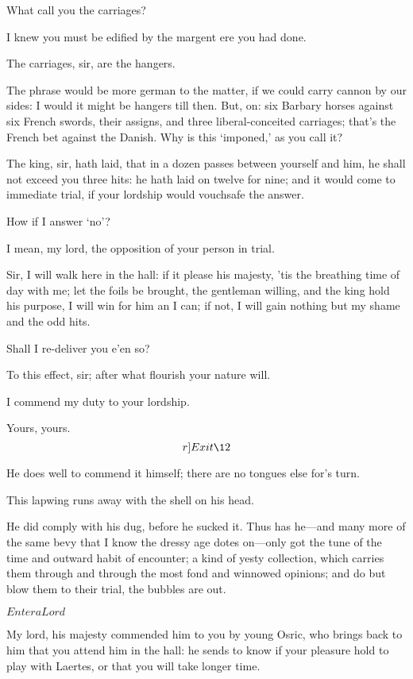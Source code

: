 \documentclass[11pt]{book}
\begin{document}
\1	What call you the carriages?

\6	I knew you must be edified by the margent ere you had done.

	The carriages, sir, are the hangers.

\1	\DriveOut* The phrase would be more german to the matter, if we
	could carry cannon by our sides: I would it might
	be hangers till then. But, on: six Barbary horses
	against six French swords, their assigns, and three
	liberal-conceited carriages; that's the French bet
	against the Danish. Why is this `imponed,' as you call it?

	The king, sir, hath laid, that in a dozen passes
	between yourself and him, he shall not exceed you
	three hits: he hath laid on twelve for nine; and it
	would come to immediate trial, if your lordship
	would vouchsafe the answer.

\1	How if I answer `no'?

	I mean, my lord, the opposition of your person in trial.

\1	Sir, I will walk here in the hall: if it please his
	majesty, 'tis the breathing time of day with me; let
	the foils be brought, the gentleman willing, and the
	king hold his purpose, I will win for him an I can;
	if not, I will gain nothing but my shame and the odd hits.

	Shall I re-deliver you e'en so?

\1	To this effect, sir; after what flourish your nature will.

	I commend my duty to your lordship.

\1	Yours, yours. 	\[r]Exit \12\]

	He does well to commend it himself; there are no
	tongues else for's turn.

\6	This lapwing runs away with the shell on his head.

\1	He did comply with his dug, before he sucked it.
	Thus has he---and many more of the same bevy that I
	know the dressy age dotes on---only got the tune of
	the time and outward habit of encounter; a kind of
	yesty collection, which carries them through and
	through the most fond and winnowed opinions; and do
	but blow them to their trial, the bubbles are out.

	\(Enter a Lord\)

	My lord, his majesty commended him to you by young
	Osric, who brings back to him that you attend him in
	the hall: he sends to know if your pleasure hold to
	play with Laertes, or that you will take longer time.
\end{document}
